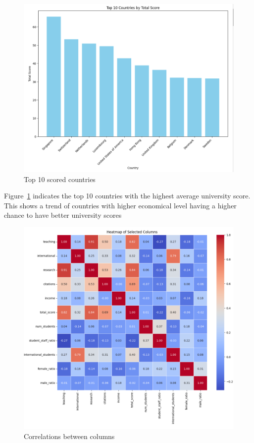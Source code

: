 \documentclass[a4paper]{article}
\begin{document}
\begin{figure}[h]
    \centering
    \includegraphics[scale=0.6]{images/WPlot1.png}
    \caption{Top 10 scored countries}
    \label{fig:fig:1}
\end{figure}
\FloatBarrier
Figure~\ref{fig:fig:1} indicates the top 10 countries with the highest average university score. This shows a trend of countries with higher economical level having a higher chance to have better university scores
\begin{figure}[h]
    \centering
    \includegraphics[scale=0.6]{images/WPlot2.png}
    \caption{Correlations between columns}
    \label{fig:fig:2}
\end{figure}
\end{document}
